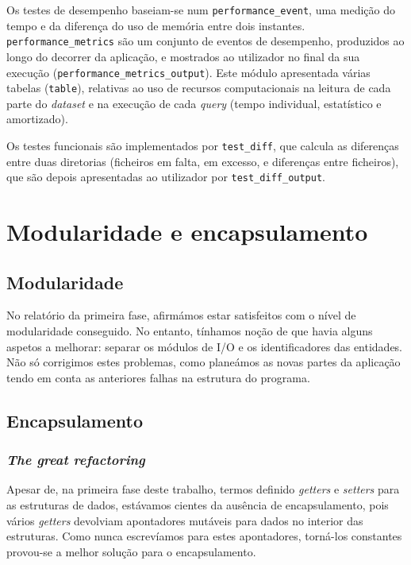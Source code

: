 \documentclass[12pt, a4paper]{article}
\begin{document}
Os testes de desempenho baseiam-se num \texttt{performance\_event}, uma medição do tempo e da
diferença do uso de memória entre dois instantes. \texttt{performance\_metrics} são um conjunto de
eventos de desempenho, produzidos ao longo do decorrer da aplicação, e mostrados ao utilizador no
final da sua execução (\texttt{performance\_metrics\_output}). Este módulo apresentada várias
tabelas (\texttt{table}), relativas ao uso de recursos computacionais na leitura de cada parte do
\emph{dataset} e na execução de cada \emph{query} (tempo individual, estatístico e amortizado).

Os testes funcionais são implementados por \texttt{test\_diff}, que calcula as diferenças entre
duas diretorias (ficheiros em falta, em excesso, e diferenças entre ficheiros), que são depois
apresentadas ao utilizador por \texttt{test\_diff\_output}.

\section{Modularidade e encapsulamento}
\label{sec:modularity-and-encapsulation}

\subsection{Modularidade}
\label{sec:modularity}

No relatório da primeira fase, afirmámos estar satisfeitos com o nível de modularidade conseguido.
No entanto, tínhamos noção de que havia alguns aspetos a melhorar: separar os módulos de I/O e os
identificadores das entidades. Não só corrigimos estes problemas, como planeámos as novas partes da
aplicação tendo em conta as anteriores falhas na estrutura do programa.

\subsection{Encapsulamento}
\label{sec:encapsulation}

\subsubsection{\emph{The great refactoring}}
\label{sec:the-great-refactoring}

Apesar de, na primeira fase deste trabalho, termos definido \emph{getters} e \emph{setters} para as
estruturas de dados, estávamos cientes da ausência de encapsulamento, pois vários \emph{getters}
devolviam apontadores mutáveis para dados no interior das estruturas. Como nunca escrevíamos para
estes apontadores, torná-los constantes provou-se a melhor solução para o encapsulamento.
\end{document}
